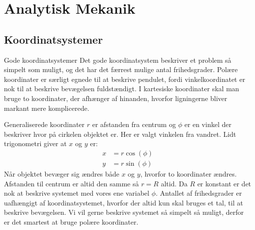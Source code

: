 \documentclass[crop=false, class=memoir]{standalone}
\begin{document}
\chapter{Analytisk Mekanik} \label{chap:mek_facit}
%
%
\section*{Koordinatsystemer}
%
\begin{opgave}[1]{Gode koordinatsystemer}
%
\opg Det gode koordinatsystem beskriver et problem så simpelt som muligt, og det har det færrest mulige antal frihedsgrader.
%
\opg Polære koordinater er særligt egnede til at beskrive pendulet, fordi vinkelkoordinatet er nok til at beskrive bevægelsen fuldstændigt. I kartesiske koordinater skal man bruge to koordinater, der afhænger af hinanden, hvorfor ligningerne bliver markant mere komplicerede.
\end{opgave}


\begin{opgave}[1]{Generaliserede koordinater}
%
\opg $r$ er afstanden fra centrum og $\phi$ er en vinkel der beskriver hvor på cirkelen objektet er. Her er valgt vinkelen fra vandret. Lidt trigonometri giver at $x$ og $y$ er:
%
\begin{align*}
	x &= r\cos(\phi)\\
	y &= r\sin(\phi)
\end{align*}
%
\opg Når objektet bevæger sig ændres både $x$ og $y$, hvorfor to koordinater ændres.
%
\opg Afstanden til centrum er altid den samme så $r=R$ altid.
%
\opg Da $R$ er konstant er det nok at beskrive systemet med vores ene variabel $\phi$. Antallet af frihedsgrader er uafhængigt af koordinatsystemet, hvorfor der altid kun skal bruges et tal, til at beskrive bevægelsen.
%
\opg Vi vil gerne beskrive systemet så simpelt så muligt, derfor er det smartest at bruge polære koordinater.
\end{opgave}
\end{document}
